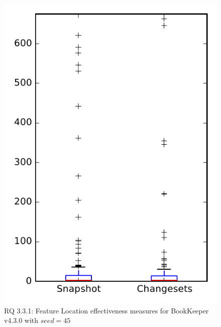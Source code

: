 
\begin{figure}
\centering
\includegraphics[height=0.4\textheight]{figures/flt_seed/rq1_bookkeeper_45}
\caption{RQ 3.3.1: Feature Location effectiveness measures for BookKeeper v4.3.0 with $seed=45$}
\label{fig:flt_seed:rq1:bookkeeper}
\end{figure}
